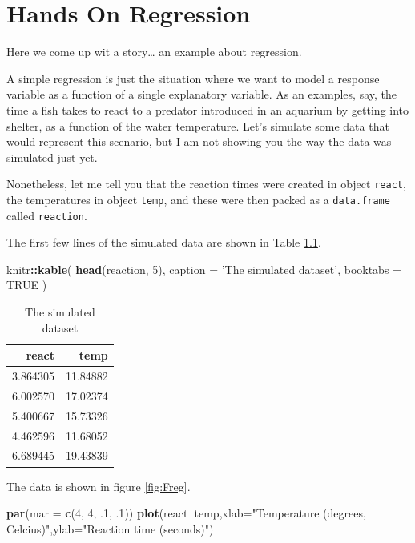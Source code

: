\documentclass[
]{book}
\newenvironment{Shaded}{\begin{snugshade}}{\end{snugshade}}
\newcommand{\DataTypeTok}[1]{\textcolor[rgb]{0.13,0.29,0.53}{#1}}
\newcommand{\DecValTok}[1]{\textcolor[rgb]{0.00,0.00,0.81}{#1}}
\newcommand{\FloatTok}[1]{\textcolor[rgb]{0.00,0.00,0.81}{#1}}
\newcommand{\KeywordTok}[1]{\textcolor[rgb]{0.13,0.29,0.53}{\textbf{#1}}}
\newcommand{\NormalTok}[1]{#1}
\newcommand{\OperatorTok}[1]{\textcolor[rgb]{0.81,0.36,0.00}{\textbf{#1}}}
\newcommand{\OtherTok}[1]{\textcolor[rgb]{0.56,0.35,0.01}{#1}}
\newcommand{\StringTok}[1]{\textcolor[rgb]{0.31,0.60,0.02}{#1}}
\begin{document}
\hypertarget{handson}{%
\chapter{Hands On Regression}\label{handson}}

Here we come up wit a story\ldots{} an example about regression.

A simple regression is just the situation where we want to model a response variable as a function of a single explanatory variable. As an examples, say, the time a fish takes to react to a predator introduced in an aquarium by getting into shelter, as a function of the water temperature. Let's simulate some data that would represent this scenario, but I am not showing you the way the data was simulated just yet.

Nonetheless, let me tell you that the reaction times were created in object \texttt{react}, the temperatures in object \texttt{temp}, and these were then packed as a \texttt{data.frame} called \texttt{reaction}.

The first few lines of the simulated data are shown in Table \ref{tab:Ttab1}.

\begin{Shaded}
\begin{Highlighting}[]
\NormalTok{knitr}\OperatorTok{::}\KeywordTok{kable}\NormalTok{(}
  \KeywordTok{head}\NormalTok{(reaction, }\DecValTok{5}\NormalTok{), }\DataTypeTok{caption =} \StringTok{'The simulated dataset'}\NormalTok{,}
  \DataTypeTok{booktabs =} \OtherTok{TRUE}
\NormalTok{)}
\end{Highlighting}
\end{Shaded}

\begin{table}

\caption{\label{tab:Ttab1}The simulated dataset}
\centering
\begin{tabular}[t]{rr}
\toprule
react & temp\\
\midrule
3.864305 & 11.84882\\
6.002570 & 17.02374\\
5.400667 & 15.73326\\
4.462596 & 11.68052\\
6.689445 & 19.43839\\
\bottomrule
\end{tabular}
\end{table}

The data is shown in figure \ref{fig:Freg}.

\begin{Shaded}
\begin{Highlighting}[]
\KeywordTok{par}\NormalTok{(}\DataTypeTok{mar =} \KeywordTok{c}\NormalTok{(}\DecValTok{4}\NormalTok{, }\DecValTok{4}\NormalTok{, }\FloatTok{.1}\NormalTok{, }\FloatTok{.1}\NormalTok{))}
\KeywordTok{plot}\NormalTok{(react}\OperatorTok{~}\NormalTok{temp,}\DataTypeTok{xlab=}\StringTok{"Temperature (degrees, Celcius)"}\NormalTok{,}\DataTypeTok{ylab=}\StringTok{"Reaction time (seconds)"}\NormalTok{)}
\end{Highlighting}
\end{Shaded}
\end{document}
